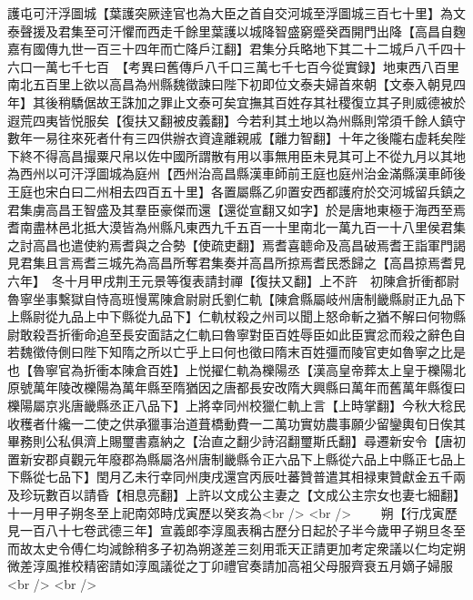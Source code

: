 護屯可汗浮圖城【葉護突厥逹官也為大臣之首自交河城至浮圖城三百七十里】為文泰聲援及君集至可汗懼而西走千餘里葉護以城降智盛窮蹙癸酉開門出降【高昌自麴嘉有國傳九世一百三十四年而亡降戶江翻】君集分兵略地下其二十二城戶八千四十六口一萬七千七百　【考異曰舊傳戶八千口三萬七千七百今從實録】地東西八百里南北五百里上欲以高昌為州縣魏徵諫曰陛下初即位文泰夫婦首來朝【文泰入朝見四年】其後稍驕倨故王誅加之罪止文泰可矣宜撫其百姓存其社稷復立其子則威德被於遐荒四夷皆悦服矣【復扶又翻被皮義翻】今若利其土地以為州縣則常須千餘人鎮守數年一易往來死者什有三四供辦衣資違離親戚【離力智翻】十年之後隴右虚耗矣陛下終不得高昌撮粟尺帛以佐中國所謂散有用以事無用臣未見其可上不從九月以其地為西州以可汗浮圖城為庭州【西州治高昌縣漢車師前王庭也庭州治金滿縣漢車師後王庭也宋白曰二州相去四百五十里】各置屬縣乙卯置安西都護府於交河城留兵鎮之君集虜高昌王智盛及其羣臣豪傑而還【還從宣翻又如字】於是唐地東極于海西至焉耆南盡林邑北抵大漠皆為州縣凡東西九千五百一十里南北一萬九百一十八里侯君集之討高昌也遣使約焉耆與之合勢【使疏吏翻】焉耆喜聼命及高昌破焉耆王詣軍門謁見君集且言焉耆三城先為高昌所奪君集奏并高昌所掠焉耆民悉歸之【高昌掠焉耆見六年】　冬十月甲戌荆王元景等復表請封禪【復扶又翻】上不許　初陳倉折衝都尉魯寧坐事繫獄自恃高班慢罵陳倉尉尉氏劉仁軌【陳倉縣屬岐州唐制畿縣尉正九品下上縣尉從九品上中下縣從九品下】仁軌杖殺之州司以聞上怒命斬之猶不解曰何物縣尉敢殺吾折衝命追至長安面詰之仁軌曰魯寧對臣百姓辱臣如此臣實忿而殺之辭色自若魏徵侍側曰陛下知隋之所以亡乎上曰何也徵曰隋末百姓彊而陵官吏如魯寧之比是也【魯寧官為折衝本陳倉百姓】上悦擢仁軌為櫟陽丞【漢高皇帝葬太上皇于櫟陽北原號萬年陵改櫟陽為萬年縣至隋猶因之唐都長安改隋大興縣曰萬年而舊萬年縣復曰櫟陽屬京兆唐畿縣丞正八品下】上將幸同州校獵仁軌上言【上時掌翻】今秋大稔民收穫者什纔一二使之供承獵事治道葺橋動費一二萬功實妨農事願少留鑾輿旬日俟其畢務則公私俱濟上賜璽書嘉納之【治直之翻少詩沼翻璽斯氏翻】尋遷新安令【唐初置新安郡貞觀元年廢郡為縣屬洛州唐制畿縣令正六品下上縣從六品上中縣正七品上下縣從七品下】閏月乙未行幸同州庚戌還宫丙辰吐蕃贊普遣其相禄東贊獻金五千兩及珍玩數百以請昏【相息亮翻】上許以文成公主妻之【文成公主宗女也妻七細翻】十一月甲子朔冬至上祀南郊時戊寅歷以癸亥為<br />
<br />
　　朔【行戊寅歷見一百八十七卷武德三年】宣義郎李淳風表稱古歷分日起於子半今歲甲子朔旦冬至而故太史令傅仁均減餘稍多子初為朔遂差三刻用乖天正請更加考定衆議以仁均定朔微差淳風推校精密請如淳風議從之丁卯禮官奏請加高袓父母服齊衰五月嫡子婦服<br />
<br />
